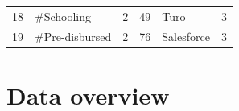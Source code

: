 \begin{longtable}{|r|l|l|r|l|l|}
	18                                & \#Schooling                        & 2                                                       & 49                               & Turo                                & 3                                                      \\
	19                                & \#Pre-disbursed                    & 2                                                       & 76                               & Salesforce                          & 3                                                      \\
\end{longtable}

\chapter{Data overview}


